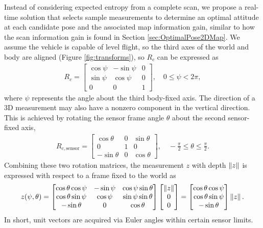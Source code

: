 Instead of considering expected entropy from a complete scan, we propose a real-time solution that selects sample measurements to determine an optimal attitude at each candidate pose and the associated map information gain, similar to how the scan information gain is found in Section \ref{sec:OptimalPose2DMap}. We assume the vehicle is capable of level flight, so the third axes of the world and body are aligned (Figure \ref{fig:transforms}), so $R_c$ can be expressed as
\begin{align*}
R_c=\begin{bmatrix}
\cos\psi & -\sin\psi & 0
\\
\sin\psi & \cos\psi & 0
\\
0 & 0 & 1
\end{bmatrix}, \quad 0\leq\psi<2\pi,
\end{align*}
where $\psi$ represents the angle about the third body-fixed axis. The direction of a 3D measurement may also have a nonzero component in the vertical direction. This is achieved by rotating the sensor frame angle $\theta$ about the second sensor-fixed axis,
\begin{align*}
R_{c,\text{sensor}}=\begin{bmatrix}
\cos\theta & 0 & \sin\theta
\\
0 & 1 & 0
\\
-\sin\theta & 0 & \cos\theta
\end{bmatrix}, \quad -\frac{\pi}{2}\leq\theta\leq\frac{\pi}{2}.
\end{align*}
Combining these two rotation matrices, the measurement $z$ with depth $\left\| z \right\|$ is expressed with respect to a frame fixed to the world as
\begin{align}
z(\psi,\theta)=\begin{bmatrix}\cos\theta\cos\psi & -\sin\psi & \cos\psi\sin\theta
\\
\cos\theta\sin\psi & \cos\psi & \sin\psi\sin\theta
\\
-\sin\theta & 0 & \cos\theta
\end{bmatrix}
\begin{bmatrix}
\left\| z \right\| \\ 0 \\ 0
\end{bmatrix}
=
\begin{bmatrix}
\cos\theta\cos\psi
\\
\cos\theta\sin\psi
\\
-\sin\theta
\end{bmatrix}\left\| z \right\|.
\end{align}
In short, unit vectors are acquired via Euler angles within certain sensor limits.

